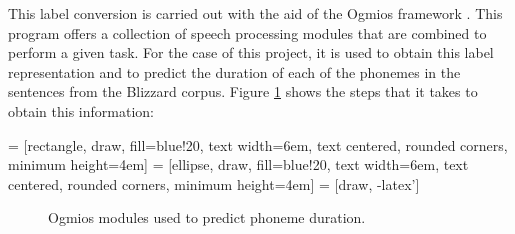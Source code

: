 
This label conversion is carried out with the aid of the Ogmios framework \cite{bonafonte2006ogmios}. This program offers a collection of speech processing modules that are combined to perform a given task. For the case of this project, it is used to obtain this label representation and to predict the duration of each of the phonemes in the sentences from the Blizzard corpus. Figure \ref{fig:ogmios-pipeline} shows the steps that it takes to obtain this information:

 = [rectangle, draw, fill=blue!20, text width=6em, text centered, rounded corners, minimum height=4em]
 = [ellipse, draw, fill=blue!20, text width=6em, text centered, rounded corners, minimum height=4em]
 = [draw, -latex']

\begin{figure}[h]
    \centering

    \caption{Ogmios modules used to predict phoneme duration.}
    \label{fig:ogmios-pipeline}
\end{figure}

